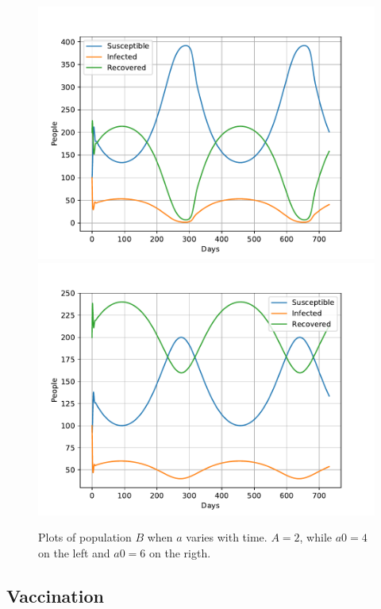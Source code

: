 \documentclass[a4paper]{article}
\let\Oldsubsection\subsection
\renewcommand{\subsection}{\FloatBarrier\Oldsubsection}
\begin{document}
\begin{figure}[!htb]
	\includegraphics[scale=0.56]{../plots/opp_d_C.pdf}
	\includegraphics[scale=0.56]{../plots/opp_d_D.pdf}
	\caption{Plots of population $B$ when $a$ varies with time. $A=2$, while $a0=4$ on the left and $a0=6$ on the rigth.}
	\label{opp_d1}
\end{figure}


\subsection{Vaccination}
\end{document}
